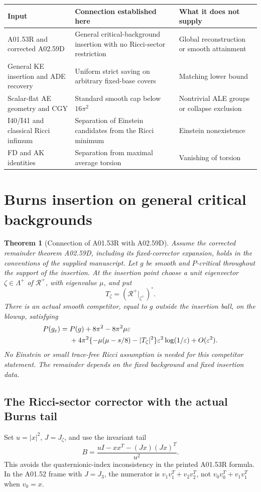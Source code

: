 \documentclass[11pt,a4paper]{article}
\newtheorem{theorem}{Theorem}[section]
\theoremstyle{remark}\newtheorem{remark}[theorem]{Remark}
\newcommand{\cR}{\mathcal R}
\newcommand{\eps}{\varepsilon}
\begin{document}
\begin{center}\small
\begin{tabular}{p{.27\linewidth}p{.31\linewidth}p{.32\linewidth}}
\toprule
Input & Connection established here & What it does not supply\\\midrule
A01.53R and corrected A02.59D & General critical-background insertion with no Ricci-sector restriction & Global reconstruction or smooth attainment\\
General KE insertion and ADE recovery & Uniform strict saving on arbitrary fixed-base covers & Matching lower bound\\
Scalar-flat AE geometry and CGY & Standard smooth cap below $16\pi^2$ & Nontrivial ALE groups or collapse exclusion\\
I40/I41 and classical Ricci infimum & Separation of Einstein candidates from the Ricci minimum & Einstein nonexistence\\
FD and AK identities & Separation from maximal average torsion & Vanishing of torsion\\\bottomrule
\end{tabular}
\end{center}

\section{Burns insertion on general critical backgrounds}
\begin{theorem}[Connection of A01.53R with A02.59D]\label{thm:insert}
Assume the corrected remainder theorem A02.59D, including its fixed-corrector expansion, holds in the conventions of the supplied manuscript. Let $g$ be smooth and $P$-critical throughout the support of the insertion. At the insertion point choose a unit eigenvector $\zeta\in\Lambda^+$ of $\cR^+$, with eigenvalue $\mu$, and put
\[
 T_\zeta=(\cR^+|_{\zeta^\perp})^\circ.
\]
There is an actual smooth competitor, equal to $g$ outside the insertion ball, on the blowup, satisfying
\begin{align}
 P(g_\eps)={}&P(g)+8\pi^2-8\pi^2\mu\eps\notag\\
 &+4\pi^2\{-\mu(\mu-s/8)-|T_\zeta|^2\}
 \eps^2\log(1/\eps)+O(\eps^2).\label{eq:insert}
\end{align}
No Einstein or small trace-free Ricci assumption is needed for this competitor statement. The remainder depends on the fixed background and fixed insertion data.
\end{theorem}

\subsection{The Ricci-sector corrector with the actual Burns tail}
Set $u=|x|^2$, $J=J_\zeta$, and use the invariant tail
\[
 B=\frac{uI-xx^T-(Jx)(Jx)^T}{u^2}.
\]
This avoids the quaternionic-index inconsistency in the printed A01.53R formula. In the A01.52 frame with $J=J_3$, the numerator is $v_1v_1^T+v_2v_2^T$, not $v_0v_0^T+v_1v_1^T$ when $v_0=x$.
\end{document}
